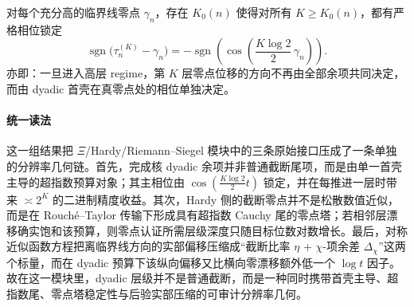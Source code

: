 \begin{conjecture}\label{conj:conclusion-xi-dyadic-shell-phase-rigidity}
对每个充分高的临界线零点 \(\gamma_n\)，存在 \(K_0(n)\) 使得对所有 \(K\ge K_0(n)\)，都有严格相位锁定
\[
\operatorname{sgn}\bigl(\tau_n^{(K)}-\gamma_n\bigr)
=
-\operatorname{sgn}\!\left(
\cos\!\left(\frac{K\log2}{2}\,\gamma_n\right)
\right).
\]
亦即：一旦进入高层 regime，第 \(K\) 层零点位移的方向不再由全部余项共同决定，而由 dyadic 首壳在真零点处的相位单独决定。
\end{conjecture}

\paragraph{统一读法}
这一组结果把 \(\Xi\)/Hardy/Riemann--Siegel 模块中的三条原始接口压成了一条单独的分辨率几何链。首先，完成核 dyadic 余项并非普通截断尾项，而是由单一首壳主导的超指数预算对象；其主相位由
\(
\cos(\frac{K\log2}{2}t)
\)
锁定，并在每推进一层时带来 \(\asymp 2^K\) 的二进制精度收益。其次，Hardy 侧的截断零点并不是松散数值近似，而是在 Rouch\'e--Taylor 传输下形成具有超指数 Cauchy 尾的零点塔；若相邻层漂移确实饱和该预算，则零点认证所需层级深度只随目标位数对数增长。最后，对称近似函数方程把离临界线方向的实部偏移压缩成“截断比率 \(\eta\) + \(\chi\)-项余差 \(\Delta_\chi\)”这两个标量，而在 dyadic 预算下该纵向偏移又比横向零漂移额外低一个 \(\log t\) 因子。故在这一模块里，dyadic 层级并不是普通截断，而是一种同时携带首壳主导、超指数尾、零点塔稳定性与后验实部压缩的可审计分辨率几何。

\endinput

